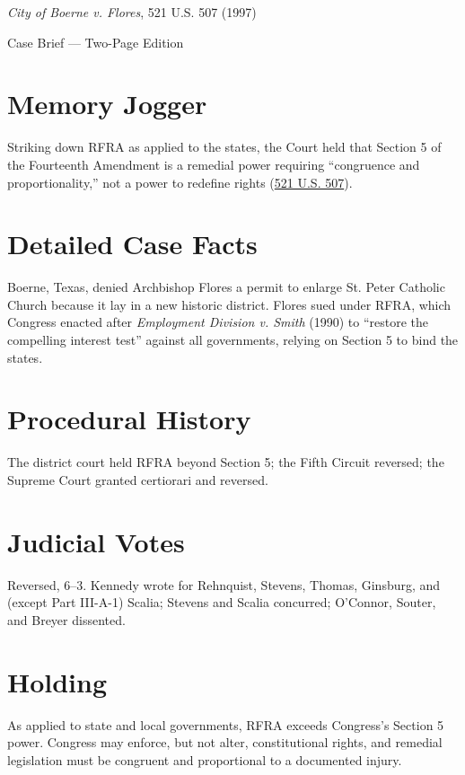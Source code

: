 \documentclass[12pt]{article}
\begin{document}
\begin{center}
{\LARGE \textit{City of Boerne v. Flores}, 521 U.S. 507 (1997)\par}
\vspace{0.5em}
{\large Case Brief --- Two-Page Edition\par}
\end{center}

\section{Memory Jogger}
Striking down RFRA as applied to the states, the Court held that Section 5 of the Fourteenth Amendment is a remedial power requiring ``congruence and proportionality,'' not a power to redefine rights (\href{https://supreme.justia.com/cases/federal/us/521/507/}{521 U.S. 507}).

\section{Detailed Case Facts}
Boerne, Texas, denied Archbishop Flores a permit to enlarge St. Peter Catholic Church because it lay in a new historic district. Flores sued under RFRA, which Congress enacted after \textit{Employment Division v. Smith} (1990) to ``restore the compelling interest test'' against all governments, relying on Section 5 to bind the states.

\section{Procedural History}
The district court held RFRA beyond Section 5; the Fifth Circuit reversed; the Supreme Court granted certiorari and reversed.

\section{Judicial Votes}
Reversed, 6--3. Kennedy wrote for Rehnquist, Stevens, Thomas, Ginsburg, and (except Part III-A-1) Scalia; Stevens and Scalia concurred; O'Connor, Souter, and Breyer dissented.

\section{Holding}
As applied to state and local governments, RFRA exceeds Congress's Section 5 power. Congress may enforce, but not alter, constitutional rights, and remedial legislation must be congruent and proportional to a documented injury.
\end{document}
